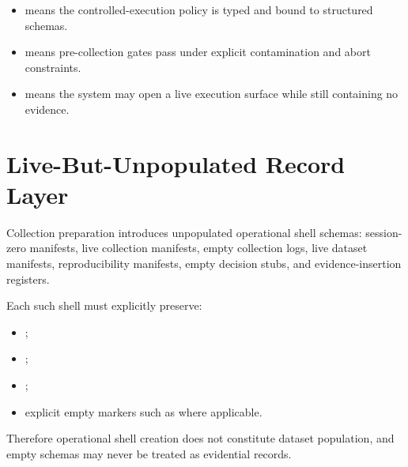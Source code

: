 \documentclass[11pt,a4paper]{article}
\begin{document}
\begin{itemize}
\item \texttt{\allowbreak{}\allowbreak{}\allowbreak{}\allowbreak{}} means the controlled-execution policy is typed and bound to structured schemas.
\item \texttt{\allowbreak{}\allowbreak{}\allowbreak{}\allowbreak{}} means pre-collection gates pass under explicit contamination and abort constraints.
\item \texttt{\allowbreak{}\allowbreak{}\allowbreak{}\allowbreak{}\allowbreak{}} means the system may open a live execution surface while still containing no evidence.
\end{itemize}

\section{Live-But-Unpopulated Record Layer}

Collection preparation introduces unpopulated operational shell schemas: session-zero manifests,
live collection manifests, empty collection logs, live dataset manifests,
reproducibility manifests, empty decision stubs, and evidence-insertion registers.

Each such shell must explicitly preserve:

\begin{itemize}
\item \texttt{\allowbreak{}\allowbreak{}\allowbreak{}};
\item \texttt{\allowbreak{}\allowbreak{}\allowbreak{}};
\item \texttt{\allowbreak{}\allowbreak{}\allowbreak{}};
\item explicit empty markers such as \texttt{\allowbreak{}\allowbreak{}} where applicable.
\end{itemize}

Therefore operational shell creation does not constitute dataset population, and empty schemas may never be treated as evidential records.
\end{document}

